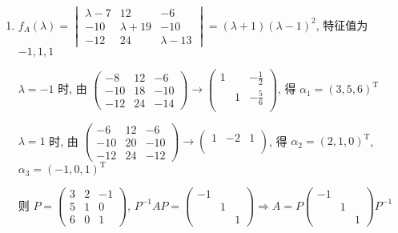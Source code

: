 	 \paragraph{} %
		 \begin{enumerate}
			 \item %
			       \( f_{A}(\lambda) = \begin{vmatrix}
				       \lambda - 7 & 12           & -6           \\
				       -10         & \lambda + 19 & -10          \\
				       -12         & 24           & \lambda - 13
			       \end{vmatrix} = (\lambda + 1)(\lambda - 1)^{2} \), 特征值为 \( -1, 1, 1 \)

			       \( \lambda = -1 \) 时, 由 \( \begin{pmatrix}
				       -8  & 12 & -6  \\
				       -10 & 18 & -10 \\
				       -12 & 24 & -14
			       \end{pmatrix} \rightarrow \begin{pmatrix}
				       1 &   & -\frac{1}{2} \\
				         & 1 & -\frac{5}{6} \\
				         &   &
			       \end{pmatrix} \), 得 \( \alpha_{1} = (3, 5, 6)^{\mathrm{T}} \)

			       \( \lambda = 1 \) 时, 由 \( \begin{pmatrix}
				       -6  & 12 & -6  \\
				       -10 & 20 & -10 \\
				       -12 & 24 & -12
			       \end{pmatrix} \rightarrow \begin{pmatrix}
				       1 & -2 & 1 \\
				         &    &   \\
				         &    &
			       \end{pmatrix} \), 得 \( \alpha_{2} = (2, 1, 0)^{\mathrm{T}} \), \( \alpha_{3} = (-1, 0, 1)^{\mathrm{T}} \)

			       则 \( P = \begin{pmatrix}
				       3 & 2 & -1 \\
				       5 & 1 & 0  \\
				       6 & 0 & 1
			       \end{pmatrix} \), \( P^{-1}AP = \begin{pmatrix}
				       -1 &   &   \\
				          & 1 &   \\
				          &   & 1
			       \end{pmatrix} \Rightarrow A = P\begin{pmatrix}
				       -1 &   &   \\
				          & 1 &   \\
				          &   & 1
			       \end{pmatrix}P^{-1} \)


\end{enumerate}
